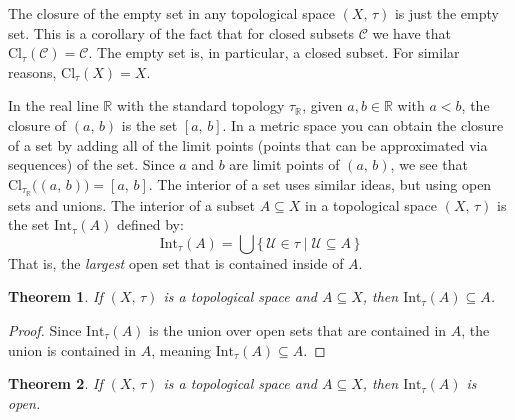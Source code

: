 \documentclass{article}
\theoremstyle{plain}
\newtheorem{theorem}{Theorem}[section]
\theoremstyle{normal}
\newenvironment{example}{%
    \pushQED{\qed}\renewcommand{\qedsymbol}{$\blacksquare$}\examplex%
}{%
    \popQED\endexamplex%
}
\newenvironment{definition}{%
    \pushQED{\qed}\renewcommand{\qedsymbol}{$\blacksquare$}\definitionx%
}{%
    \popQED\enddefinitionx%
}
\begin{document}
        \begin{example}
            The closure of the empty set in any topological space $(X,\,\tau)$
            is just the empty set. This is a corollary of the fact that for
            closed subsets $\mathcal{C}$ we have that
            $\textrm{Cl}_{\tau}(\mathcal{C})=\mathcal{C}$. The empty set is,
            in particular, a closed subset. For similar reasons,
            $\textrm{Cl}_{\tau}(X)=X$.
        \end{example}
        \begin{example}
            In the real line $\mathbb{R}$ with the standard topology
            $\tau_{\mathbb{R}}$, given $a,b\in\mathbb{R}$ with $a<b$, the
            closure of $(a,\,b)$ is the set $[a,\,b]$. In a metric space
            you can obtain the closure of a set by adding all of the
            limit points (points that can be approximated via sequences) of
            the set. Since $a$ and $b$ are limit points of $(a,\,b)$, we
            see that $\textrm{Cl}_{\tau_{\mathbb{R}}}\big((a,\,b)\big)=[a,\,b]$.
        \end{example}
        The interior of a set uses similar ideas, but using open sets and
        unions.
        \begin{definition}[\textbf{Interior of a Set}]
            The interior of a subset $A\subseteq{X}$ in a topological space
            $(X,\,\tau)$ is the set $\textrm{Int}_{\tau}(A)$ defined by:
            \begin{equation}
                \textrm{Int}_{\tau}(A)=\bigcup\{\,
                    \mathcal{U}\in\tau\;|\;\mathcal{U}\subseteq{A}\,\}
            \end{equation}
            That is, the \textit{largest} open set that is contained inside of
            $A$.
        \end{definition}
        \begin{theorem}
            If $(X,\,\tau)$ is a topological space and $A\subseteq{X}$,
            then $\textrm{Int}_{\tau}(A)\subseteq{A}$.
        \end{theorem}
        \begin{proof}
            Since $\textrm{Int}_{\tau}(A)$ is the union over open sets that are
            contained in $A$, the union is contained in $A$, meaning
            $\textrm{Int}_{\tau}(A)\subseteq{A}$.
        \end{proof}
        \begin{theorem}
            If $(X,\,\tau)$ is a topological space and $A\subseteq{X}$, then
            $\textrm{Int}_{\tau}(A)$ is open.
        \end{theorem}
\end{document}
